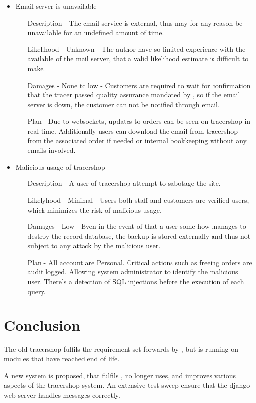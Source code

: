 \documentclass{article}
\begin{document}
\begin{itemize}
  \item Email server is unavailable
  \begin{itemize}
    \item[Description] - The email service is external, thus may for any reason be unavailable for an undefined amount of time.
    \item[Likelihood] - Unknown - The author have so limited experience with the available of the mail server, that a valid likelihood estimate is difficult to make.
    \item[Damages] - None to low - Customers are required to wait for confirmation that the tracer passed quality assurance mandated by , so if the email server is down, the customer can not be notified through email.
    \item[Plan] - Due to websockets, updates to orders can be seen on tracershop in real time. Additionally users can download the email from tracershop from the associated order if needed or internal bookkeeping without any emails involved.
  \end{itemize}
  \item Malicious usage of tracershop
  \begin{itemize}
    \item[Description] - A user of tracershop attempt to sabotage the site.
    \item[Likelyhood] - Minimal - Users both staff and customers are verified users, which minimizes the risk of malicious usage.
    \item[Damages] - Low - Even in the event of that a user some how manages to destroy the record database, the backup is stored externally and thus not subject to any attack by the malicious user.
    \item[Plan] - All account are Personal.
    Critical actions such as freeing orders are audit logged. Allowing system administrator to identify the malicious user.
    There's a detection of SQL injections before the execution of each query.
  \end{itemize}
\end{itemize}


\section*{Conclusion}
The old tracershop fulfils the requirement set forwards by , but is running on modules that have reached end of life.

A new system is proposed, that fulfils , no longer uses, and improves various aspects of the tracershop system.
An extensive test sweep ensure that the django web server handles messages correctly.






\clearpage

\printglossaries
\end{document}
